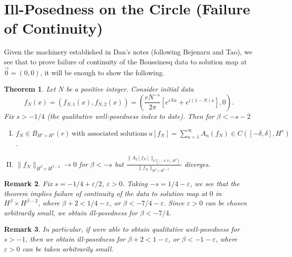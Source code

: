 \documentclass[12pt,reqno]{amsart}
\numberwithin{equation}{section}  %
\newcommand{\ee}{\varepsilon}
\newtheorem{theorem}{Theorem}[section]
\newtheorem{remark}[theorem]{Remark}
\begin{document}
\section{Ill-Posedness on the Circle (Failure of Continuity)} 
\label{sec:pf-ill-pos}
Given the machinery established in Dan's notes (following Bejenaru and Tao), we see that to prove failure of continuity of the Boussinesq data to solution map at $\vec{0} =
(0, 0)$, it will be enough to show the
following.
%
%
%
%
%
%
%
%
%
%
%
\begin{theorem}
  Let $N$ be a positive integer. Consider initial data $$f_{N}(x) =
  (f_{N,1}(x), f_{N,2}(x)) = \left ( \frac{r N^{-s}}{2 \pi}\left[ e^{iNx} + e^{i(1-N)x} \right], 0
  \right ).$$  Fix $ s > -1/4$ (the qualitative well-posedness index to date). Then for $\beta < -s -2$
    \begin{enumerate}[(I)]
      \item{$ f_{N} \in B_{H^{s} \times H^{s}}(r) \ \text{with associated
    solutions}
    \ u[f_{N}] = \sum_{n=1}^{\infty} A_{n}(f_{N}) \in C([-\delta, \delta],
    H^{s})$}.
    \\
  \item
    $\|f_{N}\|_{H^{\beta} \times H^{\beta-2}} \to 0$ for $\beta < -s$ but 
    $ \displaystyle \frac{\|A_{2}[f_{N}]\|_{C( [-\delta, \delta], H^{\beta})}}{\| f_{N} \|_{H^{\beta} \times H^{\beta -2}}}$ diverges.
\end{enumerate}
\label{thm:ill-pos}
\end{theorem}
%
%
\begin{framed}
  \begin{remark}
    Fix $s = -1/4 + \ee/2$, $\ee > 0$. Taking $-s = 1/4 - \ee$, we see that the theorem implies failure of continuity of the data to solution map at $0$ in $H^{\beta} \times H^{\beta -2}$, where $\beta + 2 < 1/4 - \ee$, or $\beta < -7/4 - \ee$. Since $\ee > 0$ can be chosen arbitrarily small, we obtain ill-posedness for $\beta < -7/4$. 
  \end{remark}
\end{framed}
%
%
\begin{framed}
  \begin{remark}
    In particular, if were able to obtain qualitative well-posedness for $s >-1$, then we obtain ill-posedness for $\beta + 2 < 1 - \ee$, or $ \beta < -1 - \ee$, where $\ee > 0$ can be taken arbitrarily small. 
  \end{remark}
\end{framed}
\end{document}
